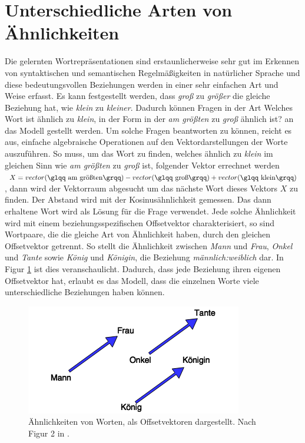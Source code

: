 \documentclass[12pt,a4paper]{report}
\begin{document}
\section{Unterschiedliche Arten von Ähnlichkeiten}
Die gelernten Wortrepräsentationen sind erstaunlicherweise sehr gut im Erkennen von syntaktischen und semantischen Regelmäßigkeiten in natürlicher Sprache und diese bedeutungsvollen Beziehungen werden in einer sehr einfachen Art und Weise erfasst\cite{DBLP:conf/naacl/MikolovYZ13}. Es kann festgestellt werden, dass \textit{groß} zu \textit{größer} die gleiche Beziehung hat, wie \textit{klein} zu \textit{kleiner}\citep{DBLP:journals/corr/abs-1301-3781}. Dadurch können Fragen in der Art \glqq Welches Wort ist ähnlich zu \textit{klein}, in der Form in der \textit{am größten} zu \textit{groß} ähnlich ist?\grqq{} an das Modell gestellt werden. Um solche Fragen beantworten zu können, reicht es aus, einfache algebraische Operationen auf den Vektordarstellungen der Worte auszuführen\citep{DBLP:journals/corr/abs-1301-3781}. So muss, um das Wort zu finden, welches ähnlich zu \textit{klein} im gleichen Sinn wie \textit{am größten} zu \textit{groß} ist, folgender Vektor errechnet werden $X = vector(\textrm{\glqq am größten\grqq}) - vector(\textrm{\glqq groß\grqq}) + vector(\textrm{\glqq klein\grqq})$, dann wird der Vektorraum abgesucht um das nächste Wort dieses Vektors $X$ zu finden\citep{DBLP:journals/corr/abs-1301-3781}. Der Abstand wird mit der Kosinusähnlichkeit gemessen. Das dann erhaltene Wort wird als Lösung für die Frage verwendet. Jede solche Ähnlichkeit wird mit einem beziehungsspezifischen Offsetvektor charakterisiert\citep{DBLP:conf/naacl/MikolovYZ13}, so sind Wortpaare, die die gleiche Art von Ähnlichkeit haben, durch den gleichen Offsetvektor getrennt. So stellt die Ähnlichkeit zwischen \textit{Mann} und \textit{Frau}, \textit{Onkel} und \textit{Tante} sowie \textit{König} und \textit{Königin}, die Beziehung \textit{männlich:weiblich} dar. In Figur \ref{fig:offsetvectors} ist dies veranschaulicht. Dadurch, dass jede Beziehung ihren eigenen Offsetvektor hat, erlaubt es das Modell, dass die einzelnen Worte viele unterschiedliche Beziehungen haben können.



\begin{figure}[h]
  \begin{center}
	\includegraphics[scale=0.65]{OffsetVector2.png}
  \end{center}  
  \caption{Ähnlichkeiten von Worten, als Offsetvektoren dargestellt. Nach Figur 2 in \citep{DBLP:conf/naacl/MikolovYZ13}.}
  \label{fig:offsetvectors}
\end{figure}
\end{document}
